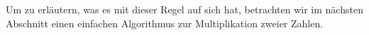 \noindent
Um zu erläutern, was es mit dieser Regel auf sich hat, betrachten wir
im nächsten Abschnitt einen einfachen Algorithmus zur Multiplikation
zweier Zahlen.




